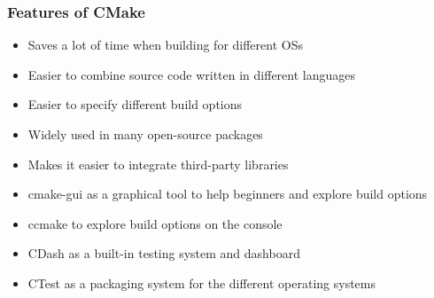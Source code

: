 \begin{frame}
  \frametitle{Features of CMake}

        \begin{itemize}
          \item Saves a lot of time when building for different OSs 
          \item Easier to combine source code written in different languages 
          \item Easier to specify different build options 
          \item Widely used in many open-source packages
          \item Makes it easier to integrate third-party libraries
          \item cmake-gui as a graphical tool to help beginners and explore build options 
          \item ccmake to explore build options on the console 
          \item CDash as a built-in testing system and dashboard 
          \item CTest as a packaging system for the different operating systems 
        \end{itemize}

\end{frame}

